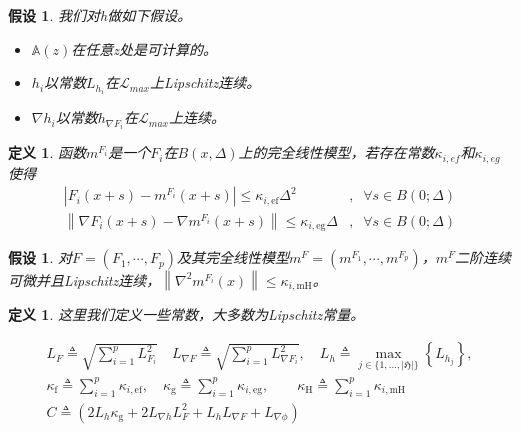 \documentclass[macfonts]{njuthesis}
\newtheorem{defn}[thm]{定义}
\newtheorem{asp}[thm]{假设}
\begin{document}
\begin{asp}
我们对h做如下假设。
\begin{itemize}
\item $\mathbb{A}(z)$在任意z处是可计算的。
\item $h_i$以常数$L_{h_i}$在$\mathcal{L}_{max}$上Lipschitz连续。
\item $\nabla h_i$以常数$h_{\nabla F_i}$在$\mathcal{L}_{max}$上连续。
\end{itemize}
\end{asp}

\begin{defn}
函数$m^{F_i}$是一个$F_i$在$B(x,\Delta)$上的完全线性模型，若存在常数$\kappa_{i,ef}$和$\kappa_{i,eg}$使得
$$
\begin{aligned}
\left|F_{i}(x+s)-m^{F_{i}}(x+s)\right| \leq \kappa_{i, \mathrm{ef}} \Delta^{2} &,\;\; \forall s \in B(0 ; \Delta) \\
\left\|\nabla F_{i}(x+s)-\nabla m^{F_{i}}(x+s)\right\| \leq \kappa_{i, \mathrm{eg}} \Delta &,\;\; \forall s \in B (0 ; \Delta)
\end{aligned}
$$
\end{defn}

\begin{asp}
\label{secondlip}
对$F=(F_1,\cdots,F_p)$及其完全线性模型$m^F=(m^{F_1},\cdots, m^{F_p})$，$m^F$二阶连续可微并且Lipschitz连续，$\left\|\nabla^{2} m^{F_{i}}(x)\right\| \leq \kappa_{i, \mathrm{mH}}$。
\end{asp}


\begin{defn}
\label{constants}
这里我们定义一些常数，大多数为Lipschitz常量。

$$
\begin{array}{c}
L_{F} \triangleq \sqrt{\sum_{i=1}^{p} L_{F_{i}}^{2}} \quad L_{\nabla F} \triangleq \sqrt{\sum_{i=1}^{p} L_{\nabla F_{i}}^{2}}, \quad L_{h} \triangleq \max _{j \in\{1, \ldots,|\mathfrak{H}|\}}\left\{L_{h_{j}}\right\}, \\
\kappa_{\mathrm{f}} \triangleq \sum_{i=1}^{p} \kappa_{i, \mathrm{ef}}, \quad \kappa_{\mathrm{g}} \triangleq \sum_{i=1}^{p} \kappa_{i, \mathrm{eg}}, \quad \quad \kappa_{\mathrm{H}} \triangleq \sum_{i=1}^{p} \kappa_{i, \mathrm{mH}} \\
C \triangleq\left(2 L_{h} \kappa_{\mathrm{g}}+2 L_{\nabla h} L_{F}^{2}+L_{h} L_{\nabla F}+L_{\nabla \phi}\right)
\end{array}
$$
\end{defn}
\end{document}
